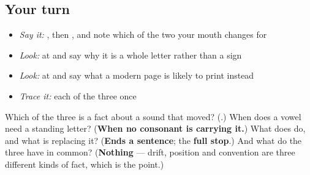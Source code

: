\subsection*{Your turn}
\begin{itemize}
\raggedright
  \item \emph{Say it:} \textbf{}, then \textbf{}, and note which of the two your mouth changes for
  \item \emph{Look:} at \textbf{} and say why it is a whole letter rather than a sign
  \item \emph{Look:} at \textbf{} and say what a modern page is likely to print instead
  \item \emph{Trace it:} each of the three once
\end{itemize}

\begin{tcolorbox}[breakable,colback=teal!4,colframe=teal!35!black,title={Before you move on}]
Which of the three is a fact about a sound that moved? (\textbf{}.) When does a vowel need a standing letter? (\textbf{When no consonant is carrying it.}) What does \textbf{} do, and what is replacing it? (\textbf{Ends a sentence}; the \textbf{full stop}.) And what do the three have in common? (\textbf{Nothing} — drift, position and convention are three different kinds of fact, which is the point.)
\end{tcolorbox}
